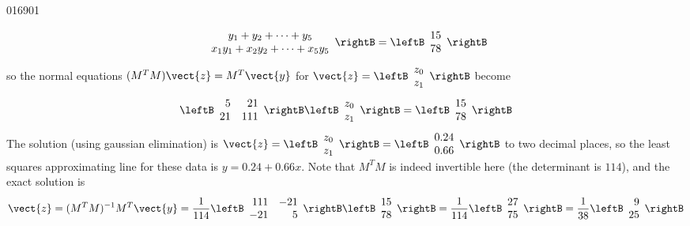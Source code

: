 \begin{example}{}{016901}
\begin{solution}
\begin{align*}
\begin{array}{c}
	y_1 + y_2 + \dotsb + y_5 \\
	x_1y_1 + x_2y_2 + \dotsb + x_5y_5
\end{array} \rightB
= \leftB \begin{array}{r}
	15 \\
	78
\end{array} \rightB
\end{align*}
so the normal equations $(M^{T}M)\vect{z} = M^{T}\vect{y}$ for 
$\vect{z} = 
\leftB \begin{array}{r}
z_0 \\
z_1
\end{array} \rightB$ become
\begin{equation*}
\leftB \begin{array}{rr}
 5 & 21 \\
21 & 111
\end{array} \rightB
\leftB \begin{array}{r}
z_0 \\
z_1
\end{array} \rightB
= \leftB \begin{array}{r}
15 \\
78
\end{array} \rightB
\end{equation*}
The solution (using gaussian elimination) is $\vect{z} = 
\leftB \begin{array}{r}
z_0 \\
z_1
\end{array} \rightB
=\leftB \begin{array}{r}
0.24 \\
0.66
\end{array} \rightB$ to two decimal places, so the least squares approximating line for these data is $y = 0.24 + 0.66x$. Note that $M^{T}M$ is indeed invertible here (the determinant is $114$), and the exact solution is
\begin{equation*}
\vect{z} = (M^TM)^{-1}M^T\vect{y} = \frac{1}{114}
\leftB \begin{array}{rr}
111 & -21 \\
-21 &   5
\end{array} \rightB
\leftB \begin{array}{rr}
15 \\
78
\end{array} \rightB
= \frac{1}{114}
\leftB \begin{array}{r}
27 \\
75
\end{array} \rightB
= \frac{1}{38}
\leftB \begin{array}{r}
9 \\
25
\end{array} \rightB
\end{equation*}
\end{solution}
\end{example}

